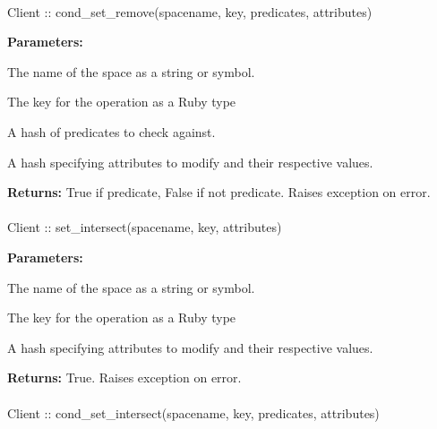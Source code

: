 \paragraph{}
\begin{ccode}
Client :: cond_set_remove(spacename, key, predicates, attributes)
\end{ccode}
\funcdesc 

\noindent\textbf{Parameters:}
\begin{description}[labelindent=\widthof{{\code{predicates}}},leftmargin=*,noitemsep,nolistsep,align=right]
\item[\code{spacename}] The name of the space as a string or symbol.
\item[\code{key}] The key for the operation as a Ruby type
\item[\code{predicates}] A hash of predicates to check against.
\item[\code{attributes}] A hash specifying attributes to modify and their respective values.
\end{description}

\noindent\textbf{Returns:}
True if predicate, False if not predicate.  Raises exception on error.

\paragraph{}
\begin{ccode}
Client :: set_intersect(spacename, key, attributes)
\end{ccode}
\funcdesc 

\noindent\textbf{Parameters:}
\begin{description}[labelindent=\widthof{{\code{attributes}}},leftmargin=*,noitemsep,nolistsep,align=right]
\item[\code{spacename}] The name of the space as a string or symbol.
\item[\code{key}] The key for the operation as a Ruby type
\item[\code{attributes}] A hash specifying attributes to modify and their respective values.
\end{description}

\noindent\textbf{Returns:}
True.  Raises exception on error.

\paragraph{}
\begin{ccode}
Client :: cond_set_intersect(spacename, key, predicates, attributes)
\end{ccode}
\funcdesc 

